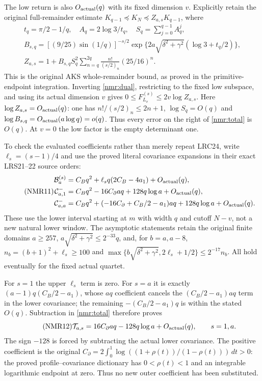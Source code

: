 The low return is also $O_{\rm actual}(q)$ with its fixed dimension
$v$. Explicitly retain the original full-remainder estimate
$K_{q-1}\preceq K_N\preceq Z_{a,s}K_{q-1}$, where
\begin{equation}\tag{NMR10}\label{nmr:Z}
\begin{gathered}
t_q=\pi/2-1/q,\quad A_q=2\log3/t_q,\quad
S_q=\sum_{j=0}^{q-1}A_q^j,\\
B_{s,q}=[(9/25)\sin(1/q)]^{-s/2}
        \exp\{2a\sqrt{\delta^2+\gamma^2}(\log3+t_q/2)\},\\
Z_{a,s}=1+B_{s,q}S_q^2
           \sum_{n=q}^{2q}\frac{n!}{(s/2)_n}(25/16)^n .
\end{gathered}
\end{equation}
This is the original AKS whole-remainder bound, as proved in the
primitive-endpoint integration. Inverting \eqref{nmr:dual},
restricting to the fixed low subspace, and using its actual dimension
$v$ gives $0\leq F_{L_v}^{(s)}\leq2v\log Z_{a,s}$.
Here $\log Z_{a,s}=O_{\rm actual}(q)$: one has
$n!/(s/2)_n\leq2n+1$, $\log S_q=O(q)$ and
$\log B_{s,q}=O_{\rm actual}(a\log q)=o(q)$.
Thus every error on the right of \eqref{nmr:total} is $O(q)$.
At $v=0$ the low factor is the empty determinant one.

To check the evaluated coefficients rather than merely repeat LRC24,
write $\ell_s=(s-1)/4$ and use the proved literal covariance
expansions in their exact LRS21--22 source orders:
\begin{equation}\tag{NMR11}\label{nmr:covariances}
\begin{aligned}
\mathcal B_a^{(s)}
 &=C_Bq^2+\ell_sq(2C_B-4a_1)+O_{\rm actual}(q),\\
\mathcal C^-_{a,1}
 &=C_Bq^2-16C_\partial aq+128q\log a+O_{\rm actual}(q),\\
\mathcal C^-_{a,a}
 &=C_Bq^2+(-16C_\partial+C_B/2-a_1)aq
                  +128q\log a+O_{\rm actual}(q).
\end{aligned}
\end{equation}
These use the lower interval starting at $m$ with width $q$ and
cutoff $N-v$, not a new natural lower window. The asymptotic
statements retain the original finite domains
$a\geq257$,
$a\sqrt{\delta^2+\gamma^2}\leq2^{-33}q$, and, for $b=a,a-8$,
$n_b=(b+1)^2+\ell_s\geq100$ and
$\max\{b\sqrt{\delta^2+\gamma^2},2\ell_s+1/2\}\leq2^{-17}n_b$.
All hold eventually for the fixed actual quartet.

For $s=1$ the upper $\ell_s$ term is zero. For $s=a$ it is exactly
$(a-1)q(C_B/2-a_1)$, whose $aq$ coefficient cancels the
$(C_B/2-a_1)aq$ term in the lower covariance; the remaining
$-(C_B/2-a_1)q$ is within the stated $O(q)$.
Subtraction in \eqref{nmr:total} therefore proves
\begin{equation}\tag{NMR12}\label{nmr:native-value}
\mathcal T_{a,s}
=16C_\partial aq-128q\log a+O_{\rm actual}(q),
\qquad s=1,a .
\end{equation}
The sign $-128$ is forced by subtracting the actual lower covariance.
The positive coefficient is the original
$C_\partial=2\int_0^1\log((1+\rho(t))/(1-\rho(t)))\,dt>0$:
the proved profile--covariance dictionary has
$0<\rho(t)<1$ and an integrable logarithmic endpoint at zero.
Thus no new outer coefficient has been substituted.

